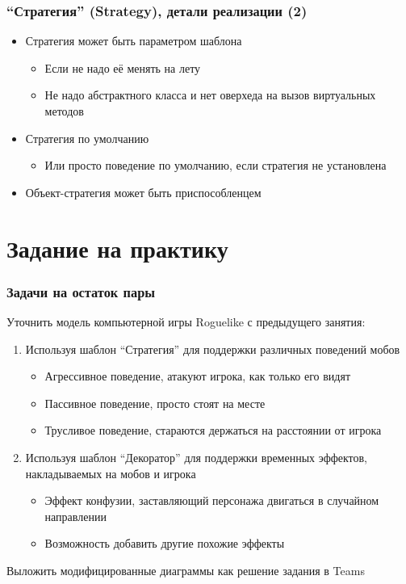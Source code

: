 \documentclass[xetex,mathserif,serif]{beamer}
\begin{document}
    \begin{frame}
        \frametitle{``Стратегия'' (Strategy), детали реализации (2)}
        \begin{itemize}
            \item Стратегия может быть параметром шаблона
            \begin{itemize}
                \item Если не надо её менять на лету
                \item Не надо абстрактного класса и нет оверхеда на вызов виртуальных методов
            \end{itemize}
            \item Стратегия по умолчанию
            \begin{itemize}
                \item Или просто поведение по умолчанию, если стратегия не установлена
            \end{itemize}
            \item Объект-стратегия может быть приспособленцем
        \end{itemize}
    \end{frame}

    \section{Задание на практику}

    \begin{frame}
        \frametitle{Задачи на остаток пары}
        Уточнить модель компьютерной игры Roguelike с предыдущего занятия:

        \begin{enumerate}
            \item Используя шаблон ``Стратегия'' для поддержки различных поведений мобов
            \begin{itemize}
                \item Агрессивное поведение, атакуют игрока, как только его видят
                \item Пассивное поведение, просто стоят на месте
                \item Трусливое поведение, стараются держаться на расстоянии от игрока
            \end{itemize}
            \item Используя шаблон ``Декоратор'' для поддержки временных эффектов, накладываемых на мобов и игрока
            \begin{itemize}
                \item Эффект конфузии, заставляющий персонажа двигаться в случайном направлении
                \item Возможность добавить другие похожие эффекты
            \end{itemize}
        \end{enumerate}

        Выложить модифицированные диаграммы как решение задания в Teams
    \end{frame}
\end{document}
